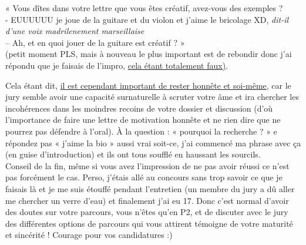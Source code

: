 \begin{center}
\begin{minipage}{0.8\linewidth}
« Vous dîtes dans votre lettre que vous êtes créatif, avez-vous des exemples ? \\
- EUUUUUU je joue de la guitare et du violon et j’aime le bricolage XD, \textit{dit-il d'une voix madrilenement marseillaise}\\
– Ah, et en quoi jouer de la guitare est créatif ? »\\

(petit moment PLS, mais à nouveau le plus important est de rebondir donc j’ai répondu que je faisais de l’impro, \href{https://www.youtube.com/watch?v=v1VDtTgh05k}{cela étant totalement faux)}.
\end{minipage}
\end{center}

Cela étant dit, \href{https://drive.google.com/file/d/1F_3OgUe7bgE-k7FpomonOPUH-EZ-9PY5/view?usp=share_link}{il est cependant important de rester honnête et soi-même}, car le jury semble avoir une capacité surnaturelle à scruter votre âme et ira chercher les incohérences dans les moindres recoins de votre dossier et discussion (d’où l’importance de faire une lettre de motivation honnête et ne rien dire que ne pourrez pas défendre à l’oral). À la question : « pourquoi la recherche ? » e répondez pas « j’aime la bio » aussi vrai soit-ce, j’ai commencé ma phrase avec ça (en guise d’introduction) et ils ont tous soufflé en haussant les sourcils. \\
Conseil de la fin, même si vous avez l’impression de ne pas avoir réussi ce n’est pas forcément le cas. Perso, j’étais allé au concours sans trop savoir ce que je faisais là et je me suis étouffé pendant l’entretien (un membre du jury a dû aller me chercher un verre d’eau) et finalement j’ai eu 17. Donc c’est normal d’avoir des doutes sur votre parcours, vous n’êtes qu’en P2, et de discuter avec le jury des différentes options de parcours qui vous attirent témoigne de votre maturité et sincérité ! Courage pour vos candidatures :)\\

